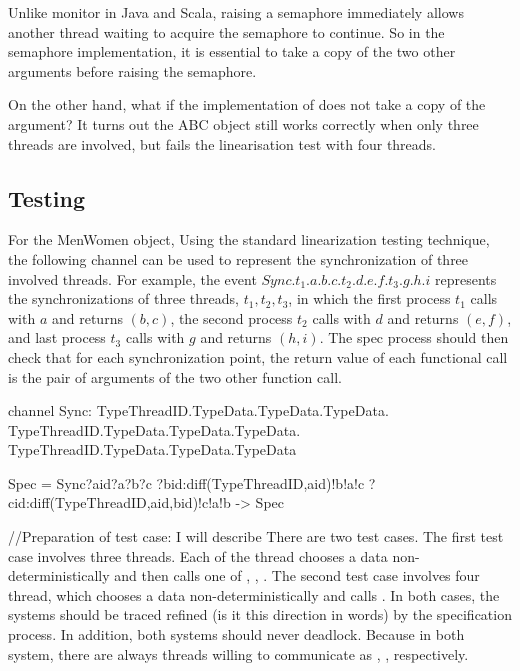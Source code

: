 \documentclass{article}
\begin{document}
Unlike monitor in Java and Scala, raising a semaphore immediately allows another thread waiting to acquire the semaphore to continue. So in the semaphore implementation, it is essential to take a copy of the two other arguments before raising the semaphore.

On the other hand, what if the implementation of  does not take a copy of the argument? It turns out the ABC object still works correctly when only three threads are involved, but fails the linearisation test with four threads.

\subsection{Testing}
For the MenWomen object, 
Using the standard linearization testing technique, the following  channel can be used to represent the synchronization of three involved threads. For example, the event $Sync.t_1.a.b.c.t_2.d.e.f.t_3.g.h.i$ represents the synchronizations of three threads, $t_1,t_2,t_3$, in which the first process $t_1$ calls  with $a$ and returns $(b,c)$, the second process $t_2$ calls  with $d$ and returns $(e,f)$, and last process $t_3$ calls  with $g$ and returns $(h,i)$. The spec process should then check that for each synchronization point, the return value of each functional call is the pair of arguments of the two other function call.

\begin{cspinline}{}{}
channel Sync: TypeThreadID.TypeData.TypeData.TypeData.
              TypeThreadID.TypeData.TypeData.TypeData.
              TypeThreadID.TypeData.TypeData.TypeData

Spec = Sync?aid?a?b?c
           ?bid:diff(TypeThreadID,{aid})!b!a!c
           ?cid:diff(TypeThreadID,{aid,bid})!c!a!b 
    -> Spec
\end{cspinline}
//Preparation of test case: I will describe 
There are two test cases. The first test case involves three threads. Each of the thread chooses a data non-deterministically and then calls one of , , . The second test case involves four thread, which chooses a data non-deterministically and calls . In both cases, the systems should be traced refined (is it this direction in words) by the specification process. In addition, both systems should never deadlock. Because in both system, there are always threads willing to communicate as , ,  respectively.
\end{document}
